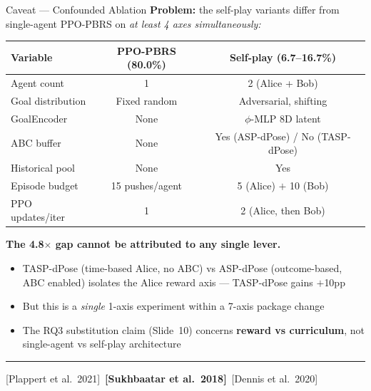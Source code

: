 \documentclass[aspectratio=169,xcolor=dvipsnames,t]{beamer}
\newcommand{\litfooter}[1]{%
  \vspace{2pt}%
  \hrule%
  \vspace{2pt}%
  {\tiny\color{LightDarkGrey} #1}%
}
\begin{document}
\begin{frame}[t]{Caveat — Confounded Ablation}
  \textbf{Problem:} the self-play variants differ from single-agent PPO-PBRS on \emph{at least 4 axes simultaneously:}

  \vspace{4pt}
  {\footnotesize
  \begin{tabular}{lcc}
    \toprule
    \textbf{Variable} & \textbf{PPO-PBRS (80.0\%)} & \textbf{Self-play (6.7--16.7\%)} \\
    \midrule
    Agent count     & 1 & 2 (Alice + Bob) \\
    Goal distribution & Fixed random & Adversarial, shifting \\
    GoalEncoder     & None & $\phi$-MLP 8D latent \\
    ABC buffer      & None & Yes (ASP-dPose) / No (TASP-dPose) \\
    Historical pool & None & Yes \\
    Episode budget  & 15 pushes/agent & 5 (Alice) $+$ 10 (Bob) \\
    PPO updates/iter& 1 & 2 (Alice, then Bob) \\
    \bottomrule
  \end{tabular}
  }

  \vspace{4pt}
  {\small \textbf{The 4.8$\times$ gap cannot be attributed to any single lever.}
  \begin{itemize}
    \item TASP-dPose (time-based Alice, no ABC) vs ASP-dPose (outcome-based, ABC enabled) isolates the Alice reward axis — TASP-dPose gains $+$10pp
    \item But this is a \emph{single} 1-axis experiment within a 7-axis package change
    \item The RQ3 substitution claim (Slide~10) concerns \textbf{reward vs curriculum}, not single-agent vs self-play architecture
  \end{itemize}}

  \vfill\litfooter{[Plappert et al.\ 2021]~\textbf{[Sukhbaatar et al.\ 2018]}~[Dennis et al.\ 2020]}
\end{frame}
\end{document}
